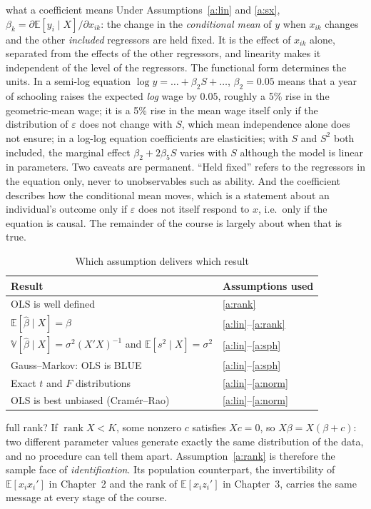 \documentclass[11pt,a4paper]{article}
\newcommand{\E}{\mathbb{E}}
\newcommand{\V}{\mathbb{V}}
\newcommand{\rank}{\operatorname{rank}}
\newcommand{\bh}{\hat\beta}
\begin{document}
\begin{whybox}{what a coefficient means}
Under Assumptions~\ref{a:lin} and \ref{a:sx}, $\beta_k=\partial\E[y_i\mid X]/\partial x_{ik}$: the change in the \emph{conditional mean} of $y$ when $x_{ik}$ changes and the other \emph{included} regressors are held fixed. It is the effect of $x_{ik}$ alone, separated from the effects of the other regressors, and linearity makes it independent of the level of the regressors. The functional form determines the units. In a semi-log equation $\log y=\dots+\beta_2S+\dots$, $\beta_2=0.05$ means that a year of schooling raises the expected \emph{log} wage by $0.05$, roughly a 5\% rise in the geometric-mean wage; it is a 5\% rise in the mean wage itself only if the distribution of $\varepsilon$ does not change with $S$, which mean independence alone does not ensure; in a log-log equation coefficients are elasticities; with $S$ and $S^2$ both included, the marginal effect $\beta_2+2\beta_5S$ varies with $S$ although the model is linear in parameters. Two caveats are permanent. ``Held fixed'' refers to the regressors in the equation only, never to unobservables such as ability. And the coefficient describes how the conditional mean moves, which is a statement about an individual's outcome only if $\varepsilon$ does not itself respond to $x$, i.e.\ only if the equation is causal. The remainder of the course is largely about when that is true.
\end{whybox}

\begin{table}[h]
\centering\small
\caption{Which assumption delivers which result}\label{tab:ch1}
\begin{tabular}{@{}ll@{}}
\toprule
Result & Assumptions used \\
\midrule
OLS is well defined & \ref{a:rank} \\
$\E[\bh\mid X]=\beta$ & \ref{a:lin}--\ref{a:rank} \\
$\V[\bh\mid X]=\sigma^2(X'X)^{-1}$ and $\E[s^2\mid X]=\sigma^2$ & \ref{a:lin}--\ref{a:sph} \\
Gauss--Markov: OLS is BLUE & \ref{a:lin}--\ref{a:sph} \\
Exact $t$ and $F$ distributions & \ref{a:lin}--\ref{a:norm} \\
OLS is best unbiased (Cram\'er--Rao) & \ref{a:lin}--\ref{a:norm} \\
\bottomrule
\end{tabular}
\end{table}

\begin{whybox}{full rank?}
If $\rank X<K$, some nonzero $c$ satisfies $Xc=0$, so $X\beta=X(\beta+c)$: two different parameter values generate exactly the same distribution of the data, and no procedure can tell them apart. Assumption~\ref{a:rank} is therefore the sample face of \emph{identification}. Its population counterpart, the invertibility of $\E[x_ix_i']$ in Chapter~2 and the rank of $\E[x_iz_i']$ in Chapter~3, carries the same message at every stage of the course.
\end{whybox}
\end{document}
